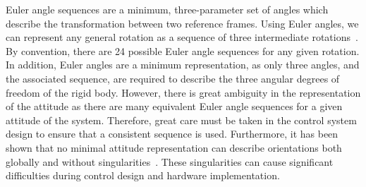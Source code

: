 Euler angle sequences are a minimum, three-parameter set of angles which describe the transformation between two reference frames.
Using Euler angles, we can represent any general rotation as a sequence of three intermediate rotations~\cite{shuster1993}.
By convention, there are \num{24} possible Euler angle sequences for any given rotation.
In addition, Euler angles are a minimum representation, as only three angles, and the associated sequence, are required to describe the three angular degrees of freedom of the rigid body.
However, there is great ambiguity in the representation of the attitude as there are many equivalent Euler angle sequences for a given attitude of the system.
Therefore, great care must be taken in the control system design to ensure that a consistent sequence is used. 
Furthermore, it has been shown that no minimal attitude representation can describe orientations both globally and without singularities~\cite{hughes2004,bhat2000}.
These singularities can cause significant difficulties during control design and hardware implementation.

